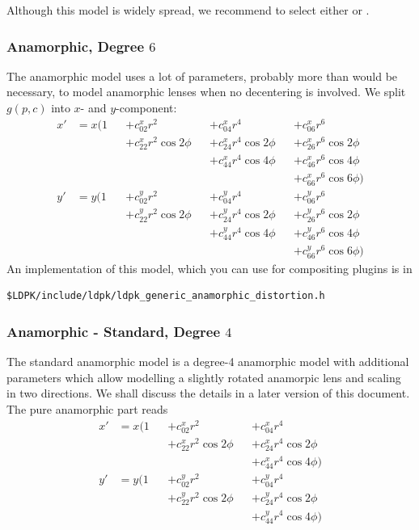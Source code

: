 \documentclass[10pt,a4paper]{article}
\begin{document}
Although this model is widely spread, we recommend to
select either  or .

\subsubsection{Anamorphic, Degree $6$}
The anamorphic model uses a lot of parameters, probably more than would be necessary,
to model anamorphic lenses when no decentering is involved.
We split $g(p,c)$ into $x$- and $y$-component:
\begin{align}
x'	&= x(1	&&+ c^x_{02} r^2 &&+ c^x_{04} r^4 &&+ c^x_{06} r^6 \nonumber\\
	&	&&+ c^x_{22} r^2 \cos{2\phi} &&+ c^x_{24} r^4 \cos{2\phi} &&+ c^x_{26} r^6 \cos{2\phi} \nonumber\\
	&	&& &&+ c^x_{44} r^4 \cos{4\phi} &&+ c^x_{46} r^6 \cos{4\phi} \nonumber\\
	&	&& && &&+ c^x_{66} r^6 \cos{6\phi})\nonumber\\
y'	&= y(1	&&+ c^y_{02} r^2 &&+ c^y_{04} r^4 &&+ c^y_{06} r^6 \nonumber\\
	&	&&+ c^y_{22} r^2 \cos{2\phi} &&+ c^y_{24} r^4 \cos{2\phi} &&+ c^y_{26} r^6 \cos{2\phi} \nonumber\\
	&	&& &&+ c^y_{44} r^4 \cos{4\phi} &&+ c^y_{46} r^6 \cos{4\phi} \nonumber\\
	&	&& && &&+ c^y_{66} r^6 \cos{6\phi})
\end{align}
An implementation of this model, which you can use for compositing plugins is in
\begin{verbatim}
$LDPK/include/ldpk/ldpk_generic_anamorphic_distortion.h
\end{verbatim}

\subsubsection{Anamorphic - Standard, Degree $4$}
The standard anamorphic model is a degree-4 anamorphic model with additional parameters
which allow modelling a slightly rotated anamorpic lens and scaling in two directions.
We shall discuss the details in a later version of this document.
The pure anamorphic part reads
\begin{align}
x'	&= x(1	&&+ c^x_{02} r^2 &&+ c^x_{04} r^4 \nonumber\\
	&	&&+ c^x_{22} r^2 \cos{2\phi} &&+ c^x_{24} r^4 \cos{2\phi} \nonumber\\
	&	&& &&+ c^x_{44} r^4 \cos{4\phi}) \nonumber\\
y'	&= y(1	&&+ c^y_{02} r^2 &&+ c^y_{04} r^4 \nonumber\\
	&	&&+ c^y_{22} r^2 \cos{2\phi} &&+ c^y_{24} r^4 \cos{2\phi} \nonumber\\
	&	&& &&+ c^y_{44} r^4 \cos{4\phi})
\end{align}
\end{document}
